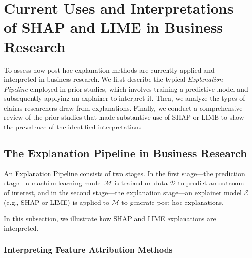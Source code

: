 \documentclass[11pt]{article}
\begin{document}



    
    
    \section{Current Uses and Interpretations of SHAP and LIME in Business Research}
        \label{sec:use_in_b_research}
        To assess how post hoc explanation methods are currently applied and interpreted in business research. We first describe the typical \emph{Explanation Pipeline} employed in prior studies, which involves training a predictive model and subsequently applying an explainer to interpret it. Then, we analyze the types of claims researchers draw from explanations.
 Finally, we conduct a comprehensive review of the prior studies that made substantive use of SHAP or LIME to show the prevalence of the identified interpretations. %

\subsection{The Explanation Pipeline in Business Research}
    \label{sec:pipeline_demo}



    
An Explanation Pipeline consists of two stages. In the first stage—the prediction stage—a machine learning model $\mathcal{M}$ is trained on data $\mathcal{D}$ to predict an outcome of interest, and in the second stage—the explanation stage—an explainer model $\mathcal{E}$ (e.g., SHAP or LIME) is applied to $\mathcal{M}$ to generate post hoc explanations.
    



\label{sec:interpretations}
In this subsection, we illustrate how SHAP and LIME explanations are interpreted.

\subsubsection{Interpreting Feature Attribution Methods}\label{sec:shap_lime_interpretation}
\end{document}

